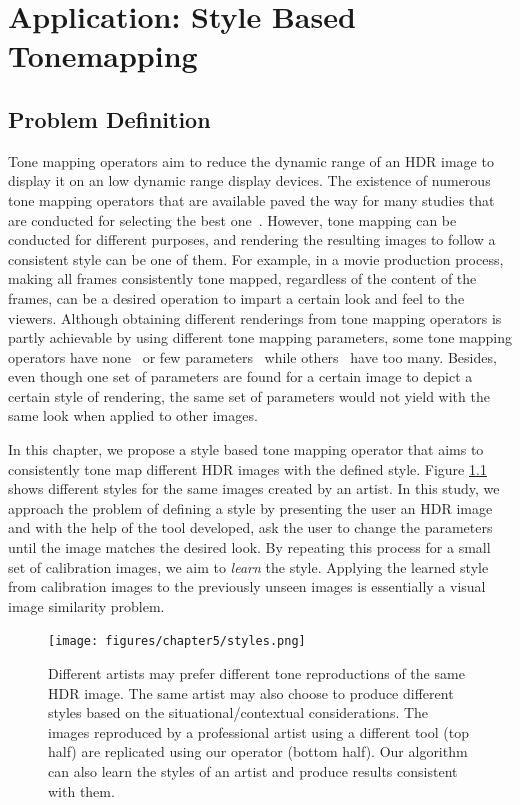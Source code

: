 \chapter{Application: Style Based Tonemapping}
\label{chp:b5}

\section{Problem Definition}

Tone mapping operators aim to reduce the dynamic range of an HDR image to display it on an low dynamic range display devices. The existence of numerous tone mapping operators that are available paved the way for many studies that are conducted for selecting the best one~\cite{parraga2018tone}. However, tone mapping can be conducted for different purposes, and rendering the resulting images to follow a consistent style can be one of them. For example, in a movie production process, making all frames consistently tone mapped, regardless of the content of the frames, can be a desired operation to impart a certain look and feel to the viewers. Although obtaining different renderings from tone mapping operators is partly achievable by using different tone mapping parameters, some tone mapping operators have none~\cite{Dura02} or few parameters~\cite{Fatt02} while others~\cite{Photomatix2010} have too many. Besides, even though one set of parameters are found for a certain image to depict a certain style of rendering, the same set of parameters would not yield with the same look when applied to other images. %

In this chapter, we propose a style based tone mapping operator that aims to consistently tone map different HDR images with the defined style. Figure \ref{fig:styles} shows different styles for the same images created by an artist. In this study, we approach the problem of defining a style by presenting the user an HDR image and with the help of the tool developed, ask the user to change the parameters until the image matches the desired look. By repeating this process for a small set of calibration images, we aim to \emph{learn} the style. Applying the learned style from calibration images to the previously unseen images is essentially a visual image similarity problem.

\begin{figure}
\begin{center}
\texttt{[image: figures/chapter5/styles.png]}
\caption{Different artists may prefer different tone reproductions of the same HDR image. The same artist may also choose to produce different styles based on the situational/contextual considerations. The images reproduced by a professional artist using a different tool (top half) are replicated using our operator (bottom half). Our algorithm can also learn the styles of an artist and produce results consistent with them.}
\label{fig:styles}
\end{center}
\end{figure}

